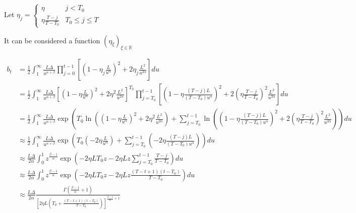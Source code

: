 \documentclass{article}
\newcommand{\R}{\mathbb{R}}
\begin{document}
Let $\eta_j = 
\left\{\begin{array}{ll}
\eta & j < T_0\\
\eta\frac{T-j}{T-T_0}& T_0 \leq j\leq T
\end{array}\right.$

\newcommand{\wsd}{\mathrm{wsd}}

It can be considered a function $(\eta_\xi)_{\xi \in \R}$

\bigskip

\begin{align*}
b_t &= \frac{1}{2} \int_{1}^{\infty} \frac{L\Delta}{u^{\alpha+\beta}} \prod_{j=0}^{t-1} \left[ \left( 1 - \eta_j \frac{L}{u^\alpha} \right)^2 + 2\eta_j \frac{L^2}{u^{2\alpha}} \right] du\\
&
=\frac{1}{2} \int_{1}^{\infty} \frac{L\Delta}{u^{\alpha+\beta}} \left[ \left( 1 - \eta\frac{L}{u^\alpha} \right)^2 + 2 \eta ^2 \frac{L^2}{u^{2\alpha}} \right]^{T_0}
\prod_{j=T_0}^{t-1} \left[ \left( 1 - \eta\frac{(T-j)L}{(T-T_0) u^\alpha} \right)^2 + 2 \left(\eta \frac{T-j}{T-T_0} \right)^2 \frac{L^2}{u^{2\alpha}} \right] du\\
&
=\frac{1}{2} \int_{1}^{\infty} \frac{L\Delta}{u^{\alpha+\beta}} \exp\left(T_0\ln\left( \left( 1 - \eta\frac{L}{u^\alpha} \right)^2 + 2 \eta ^2 \frac{L^2}{u^{2\alpha}}\right)+
\sum_{j=T_0}^{t-1} \ln \left( \left( 1 - \eta\frac{(T-j)L}{(T-T_0) u^\alpha} \right)^2 + 2 \left(\eta \frac{T-j}{T-T_0} \right)^2 \frac{L^2}{u^{2\alpha}} \right) \right)du\\
&
\approx \frac{1}{2} \int_{1}^{\infty} \frac{L\Delta}{u^{\alpha+\beta}} \exp\left(T_0\left( -2\eta \frac{L}{u^{\alpha}}\right)+
\sum_{j=T_0}^{t-1}  \left( - 2\eta\frac{(T-j)L}{(T-T_0) u^\alpha} \right) \right)du\\
&
\approx \frac{L\Delta}{2\alpha} \int_{0}^{1}z^{\frac{\beta-1}{\alpha}}  \exp\left( -2\eta LT_0z  -  2\eta L z
\sum_{j=T_0}^{t-1} \frac{T-j}{T-T_0}  \right)du\\
&
\approx \frac{L\Delta}{2\alpha} \int_{0}^{1}z^{\frac{\beta-1}{\alpha}}  \exp\left( -2\eta LT_0z  -  2\eta L z
\frac{(T-t+1)(t-T_0)}{T-T_0}  \right)du\\
&\approx
\frac{L\Delta}{2\alpha} \frac{\Gamma\left(\frac{\beta-1}{\alpha}+1\right)}{\left[ 2\eta L \left( T_0 + \frac{(T-t+1)(t-T_0)}{T-T_0} \right) \right]^{\frac{\beta-1}{\alpha}+1}}
\end{align*}
\end{document}

